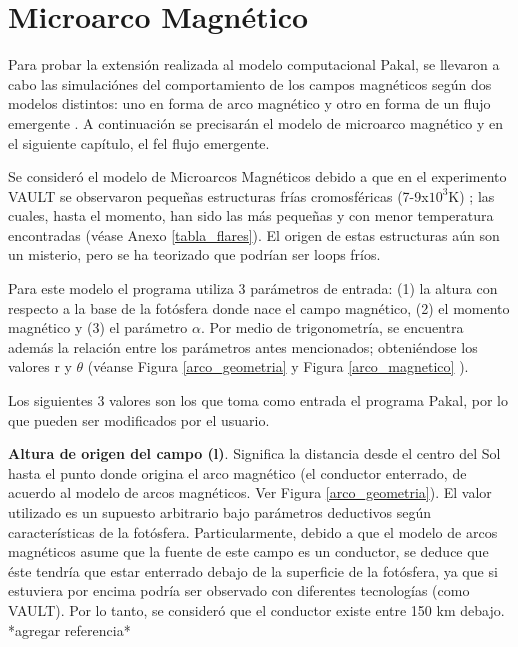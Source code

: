 \chapter{Microarco Magn\'etico} 

Para probar la extensi\'on realizada al modelo computacional Pakal, se llevaron a cabo las simulaci\'ones del comportamiento de los campos magn\'eticos seg\'un dos modelos distintos: uno en forma de arco magn\'etico \citep{ashwanden} y otro en forma de un flujo emergente \citep{flujoemergente}. A continuaci\'on se precisar\'an el modelo de microarco magn\'etico y en el siguiente cap\'itulo, el fel flujo emergente.

Se consider\'o el modelo de Microarcos Magn\'eticos debido a que en el experimento VAULT se observaron peque\~nas estructuras fr\'ias cromosf\'ericas (7-9x$10^3$K) \citep{VAULT1}; las cuales, hasta el momento, han sido las m\'as peque\~nas y con menor temperatura encontradas (v\'ease Anexo \ref{tabla_flares}). El origen de estas estructuras a\'un son un misterio, pero se ha teorizado que podr\'ian ser loops fr\'ios\citep{VAULT1}.

Para este modelo el programa utiliza 3 par\'ametros de entrada: (1) la altura con respecto a la base de la fot\'osfera donde nace el campo magn\'etico, (2) el momento magn\'etico y (3) el par\'ametro $\alpha$. Por medio de trigonometr\'ia, se encuentra adem\'as la relaci\'on entre los par\'ametros antes mencionados; obteni\'endose los valores r y $\theta$ (v\'eanse Figura \ref{arco_geometria} y Figura \ref{arco_magnetico} ).

Los siguientes 3 valores son los que toma como entrada el programa Pakal, por lo que pueden ser modificados por el usuario.

\textbf{Altura de origen del campo (l)}. Significa la distancia desde el centro del Sol hasta el punto donde origina el arco magn\'etico (el conductor enterrado, de acuerdo al modelo de arcos magn\'eticos. Ver Figura \ref{arco_geometria}). El valor utilizado es un supuesto arbitrario bajo par\'ametros deductivos seg\'un caracter\'isticas de la fot\'osfera. Particularmente, debido a que el modelo de arcos magn\'eticos asume que la fuente de este campo es un conductor, se deduce que \'este tendr\'ia que estar enterrado debajo de la superficie de la fot\'osfera, ya que si estuviera por encima podr\'ia ser observado con diferentes tecnolog\'ias (como VAULT). Por lo tanto, se consider\'o que el conductor existe entre 150 km debajo.
*agregar referencia*

